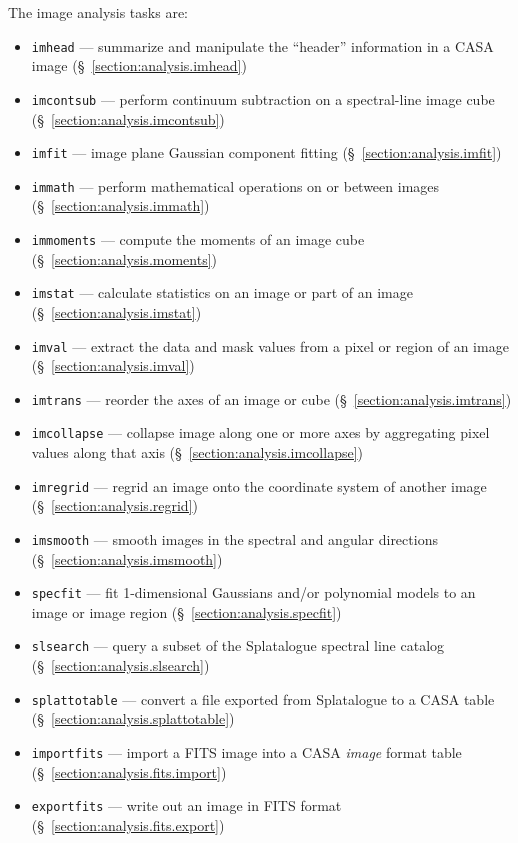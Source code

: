 The image analysis tasks are:
\begin{itemize}
   \item {\tt imhead} --- summarize and manipulate the ``header'' 
         information in a CASA image 
         (\S~\ref{section:analysis.imhead})
   \item {\tt imcontsub} --- perform continuum subtraction on a
         spectral-line image cube 
         (\S~\ref{section:analysis.imcontsub})
   \item {\tt imfit} --- image plane Gaussian component fitting
         (\S~\ref{section:analysis.imfit})
   \item {\tt immath} --- perform mathematical operations on or
         between images
         (\S~\ref{section:analysis.immath})
   \item {\tt immoments} --- compute the moments of an image cube
         (\S~\ref{section:analysis.moments})
   \item {\tt imstat} --- calculate statistics on an image or part
         of an image
         (\S~\ref{section:analysis.imstat})
   \item {\tt imval} --- extract the data and mask values from a
         pixel or region of an image
         (\S~\ref{section:analysis.imval})
  \item {\tt imtrans} --- reorder the axes of an image or cube
         (\S~\ref{section:analysis.imtrans})
  \item {\tt imcollapse} --- collapse image along one or more axes by aggregating pixel values along that axis 
         (\S~\ref{section:analysis.imcollapse})
   \item {\tt imregrid} --- regrid an image onto the coordinate
         system of another image 
         (\S~\ref{section:analysis.regrid})
   \item {\tt imsmooth} --- smooth images in the spectral and angular directions
         (\S~\ref{section:analysis.imsmooth})
   \item{\tt specfit} --- fit 1-dimensional Gaussians and/or
     polynomial models to an image or image region 
          (\S~\ref{section:analysis.specfit})
  \item{\tt slsearch} --- query a subset of the Splatalogue spectral
line catalog
          (\S~\ref{section:analysis.slsearch})
  \item{\tt splattotable} --- convert a file exported from Splatalogue
to a CASA table 
          (\S~\ref{section:analysis.splattotable})




   \item {\tt importfits} --- import a FITS image into a CASA  
         {\it image} format table 
         (\S~\ref{section:analysis.fits.import})
   \item {\tt exportfits} --- write out an image in FITS format
         (\S~\ref{section:analysis.fits.export})
\end{itemize}

